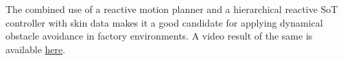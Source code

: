 The combined use of a reactive motion planner and a hierarchical reactive SoT controller with skin data makes it a good candidate for applying dynamical obstacle avoidance in factory environments.
A video result of the same is available \href{https://youtu.be/uLStjR7mpOI}{here}.

 



